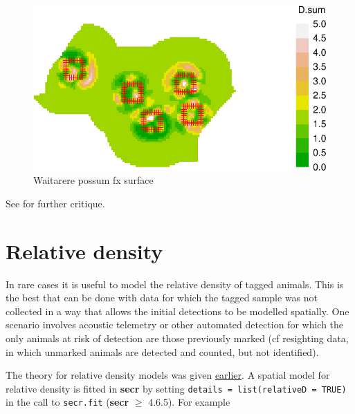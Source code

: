 \documentclass[
]{book}
\begin{document}
\begin{figure}
\includegraphics[width=0.95\linewidth]{SECRbook_files/figure-latex/fxsurfaceWplt-1} \caption{Waitarere possum fx surface}\label{fig:fxsurfaceWplt}
\end{figure}

See \citet{Durbach2024} for further critique.

\section{Relative density}\label{relativedensity2}


In rare cases it is useful to model the relative density of tagged animals. This is the best that can be done with data for which the tagged sample was not collected in a way that allows the initial detections to be modelled spatially. One scenario involves acoustic telemetry or other automated detection for which the only animals at risk of detection are those previously marked (cf resighting data, in which unmarked animals are detected and counted, but not identified).

The theory for relative density models was given \hyperref[relativedensity1]{earlier}. A spatial model for relative density is fitted in \textbf{secr} by setting \texttt{details\ =\ list(relativeD\ =\ TRUE)} in the call to \texttt{secr.fit} (\textbf{secr} \(\ge\) 4.6.5). For example
\end{document}
